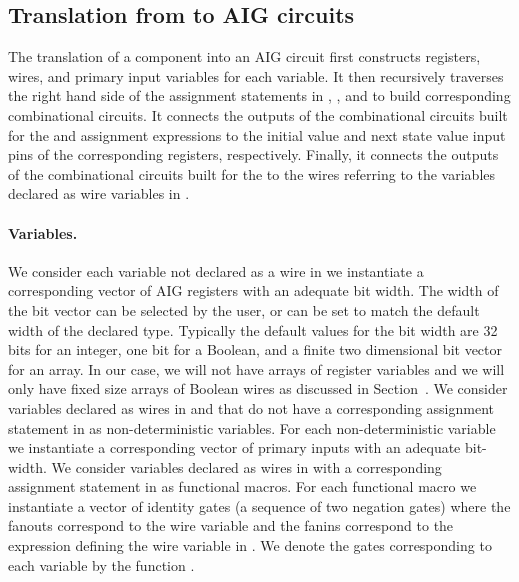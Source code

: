 
\subsection{Translation from \caig to AIG circuits }

The translation of a \caig component into an AIG circuit
first constructs registers, wires, and primary input variables for each 
\caig variable. 
%
It then recursively traverses the right hand side 
of the assignment statements in , ,
and  to build corresponding combinational circuits.
%
It connects the outputs of the combinational 
circuits built for the  and  
assignment expressions to the 
initial value and next state value input pins of the corresponding 
registers, respectively. 
%
Finally, it connects the outputs of the combinational circuits built 
for the   to the wires referring to the 
variables declared as wire variables in .

\paragraph{Variables.} 
%
We consider each variable not declared as a wire in 
we instantiate a corresponding 
vector of AIG registers with an adequate bit width. 
The width of the bit vector can be selected by the user, 
or can be set to match the default width of the declared type. 
Typically the default values for the bit width are 
32 bits for an integer, one bit for a Boolean, and a 
finite two dimensional bit vector for an array. 
In our case, we will not have arrays of register variables
and we will only have fixed size arrays of Boolean wires as 
discussed in Section~\label{s:biptocaig}.
%
We consider variables declared as wires in 
and that do not have a corresponding assignment statement 
in  as non-deterministic variables. 
For each non-deterministic variable we instantiate a corresponding
vector of primary inputs with an adequate bit-width. 
%
We consider variables declared as wires in  with 
a corresponding assignment statement in  as functional macros. 
For each functional macro we 
instantiate a vector of identity gates (a sequence of two negation gates) where the
fanouts correspond to the wire variable and the fanins correspond to
the expression defining the wire variable in . 
%
We denote the gates corresponding to each variable by the function . 

